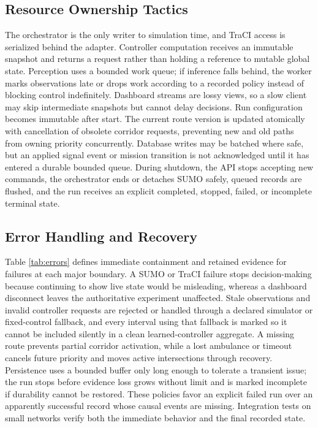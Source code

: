 \subsection{Resource Ownership Tactics}

The orchestrator is the only writer to simulation time, and TraCI access is serialized behind the adapter. Controller computation receives an immutable snapshot and returns a request rather than holding a reference to mutable global state. Perception uses a bounded work queue; if inference falls behind, the worker marks observations late or drops work according to a recorded policy instead of blocking control indefinitely. Dashboard streams are lossy views, so a slow client may skip intermediate snapshots but cannot delay decisions. Run configuration becomes immutable after start. The current route version is updated atomically with cancellation of obsolete corridor requests, preventing new and old paths from owning priority concurrently. Database writes may be batched where safe, but an applied signal event or mission transition is not acknowledged until it has entered a durable bounded queue. During shutdown, the API stops accepting new commands, the orchestrator ends or detaches SUMO safely, queued records are flushed, and the run receives an explicit completed, stopped, failed, or incomplete terminal state.

\subsection{Error Handling and Recovery}

Table \ref{tab:errors} defines immediate containment and retained evidence for failures at each major boundary. A SUMO or TraCI failure stops decision-making because continuing to show live state would be misleading, whereas a dashboard disconnect leaves the authoritative experiment unaffected. Stale observations and invalid controller requests are rejected or handled through a declared simulator or fixed-control fallback, and every interval using that fallback is marked so it cannot be included silently in a clean learned-controller aggregate. A missing route prevents partial corridor activation, while a lost ambulance or timeout cancels future priority and moves active intersections through recovery. Persistence uses a bounded buffer only long enough to tolerate a transient issue; the run stops before evidence loss grows without limit and is marked incomplete if durability cannot be restored. These policies favor an explicit failed run over an apparently successful record whose causal events are missing. Integration tests on small networks verify both the immediate behavior and the final recorded state.

